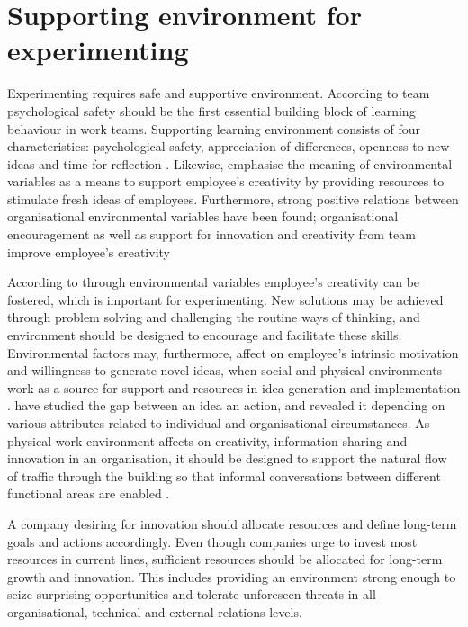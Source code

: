 \section{Supporting environment for experimenting}
Experimenting requires safe and supportive environment. According to \citet{edmondson1999psychological} team psychological safety should be the first essential building block of learning behaviour in work teams. Supporting learning environment consists of four characteristics: psychological safety, appreciation of differences, openness to new ideas and time for reflection \citep{garvin2008yours}. Likewise, \citet{mumford1988creativity} emphasise the meaning of environmental variables as a means to support employee's creativity by providing resources to stimulate fresh ideas of employees. Furthermore, strong positive relations between organisational environmental variables have been found; organisational encouragement as well as support for innovation and creativity from team improve employee's creativity \citep{amabile1996assessing}

According to \citet{mumford1988creativity} through environmental variables employee's creativity can be fostered, which is important for experimenting. New solutions may be achieved through problem solving and challenging the routine ways of thinking, and environment should be designed to encourage and facilitate these skills. Environmental factors may, furthermore, affect on employee's intrinsic motivation and willingness to generate novel ideas, when social and physical environments work as a source for support and resources in idea generation and implementation \citep{amabile1998kill,mumford1988creativity}. \citet{mumford1988creativity} have studied the gap between an idea an action, and revealed it depending on various attributes related to individual and organisational circumstances. As physical work environment affects on creativity, information sharing and innovation in an organisation, it should be designed to support the natural flow of traffic through the building so that informal conversations between different functional areas are enabled \citep{shalley2004leaders}. 

A company desiring for innovation should allocate resources and define long-term goals and actions accordingly. Even though companies urge to invest most resources in current lines, sufficient resources should be allocated for long-term growth and innovation. This includes providing an environment strong enough to seize surprising opportunities and tolerate unforeseen threats in all organisational, technical and external relations levels. \citep{quinn1985managing} 

